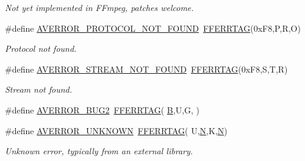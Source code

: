\begin{DoxyCompactItemize}
\begin{DoxyCompactList}\small\item\em Not yet implemented in F\+Fmpeg, patches welcome. \end{DoxyCompactList}\item 
\#define \hyperlink{group__lavu__error_ga474b367d2654695a79c07998329c7896}{A\+V\+E\+R\+R\+O\+R\+\_\+\+P\+R\+O\+T\+O\+C\+O\+L\+\_\+\+N\+O\+T\+\_\+\+F\+O\+U\+ND}~\hyperlink{group__lavu__error_gacfc46235e91e0770b94f7918013a1034}{F\+F\+E\+R\+R\+T\+AG}(0x\+F8,\textquotesingle{}\+P\textquotesingle{},\textquotesingle{}\+R\textquotesingle{},\textquotesingle{}\+O\textquotesingle{})
\begin{DoxyCompactList}\small\item\em Protocol not found. \end{DoxyCompactList}\item 
\#define \hyperlink{group__lavu__error_gab15683efe944a563b5c90dc6c5d5c17b}{A\+V\+E\+R\+R\+O\+R\+\_\+\+S\+T\+R\+E\+A\+M\+\_\+\+N\+O\+T\+\_\+\+F\+O\+U\+ND}~\hyperlink{group__lavu__error_gacfc46235e91e0770b94f7918013a1034}{F\+F\+E\+R\+R\+T\+AG}(0x\+F8,\textquotesingle{}\+S\textquotesingle{},\textquotesingle{}\+T\textquotesingle{},\textquotesingle{}\+R\textquotesingle{})
\begin{DoxyCompactList}\small\item\em Stream not found. \end{DoxyCompactList}\item 
\#define \hyperlink{group__lavu__error_gafdd5fd9898cc229e1856f858308d956e}{A\+V\+E\+R\+R\+O\+R\+\_\+\+B\+U\+G2}~\hyperlink{group__lavu__error_gacfc46235e91e0770b94f7918013a1034}{F\+F\+E\+R\+R\+T\+AG}( \textquotesingle{}\hyperlink{libnyquist_2nyquist_2nyqsrc_2add_8c_a111da81ae5883147168bbb8366377b10}{B}\textquotesingle{},\textquotesingle{}U\textquotesingle{},\textquotesingle{}G\textquotesingle{},\textquotesingle{} \textquotesingle{})
\item 
\#define \hyperlink{group__lavu__error_ga4ebaa288c7684a26a591c501208910e4}{A\+V\+E\+R\+R\+O\+R\+\_\+\+U\+N\+K\+N\+O\+WN}~\hyperlink{group__lavu__error_gacfc46235e91e0770b94f7918013a1034}{F\+F\+E\+R\+R\+T\+AG}( \textquotesingle{}U\textquotesingle{},\textquotesingle{}\hyperlink{rfft2d_test_m_l_8m_af6d1246b147a7c5763d9fc83082020ff}{N}\textquotesingle{},\textquotesingle{}K\textquotesingle{},\textquotesingle{}\hyperlink{rfft2d_test_m_l_8m_af6d1246b147a7c5763d9fc83082020ff}{N}\textquotesingle{})
\begin{DoxyCompactList}\small\item\em Unknown error, typically from an external library. \end{DoxyCompactList}\item 

\end{DoxyCompactItemize}
